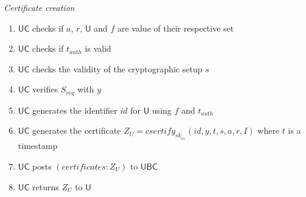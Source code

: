 \documentclass[bibtotoc,halfparskip,oneside]{scrreprt}
\newcommand{\sk}[1]{\mathit{sk}_{#1}\xspace}
\newcommand{\SK}[1]{\sk{_#1}\xspace}
\newcommand{\User}{\ensuremath{\mathsf{U}}\xspace}
\newcommand{\IdentityProvider}{\ensuremath{\mathsf{U}}\xspace}
\newcommand{\UBC}{\ensuremath{\mathsf{UBC}}\xspace}
\newcommand{\UC}{\ensuremath{\mathsf{UC}}\xspace}
\begin{document}
\textit{Certificate creation}
\begin{enumerate}[resume]
	\item \UC checks if $a$, $r$, $\IdentityProvider$ and $\mathit{f}$ are value of their respective set
	\item \UC checks if $t_{auth}$ is valid
	\item \UC checks the validity of the cryptographic setup $s$
	\item \UC verifies $S_{req}$ with $y$
	\item \UC generates the identifier $id$ for $\User$ using $\mathit{f}$ and $t_{auth}$
	\item \UC generates the certificate $Z_{U}=\mathit{csertify}_{\SK{\UC}}(id,y,t, s,a,r,I)$ where $t$ is a timestamp
	\item \UC posts $(\mathit{certificates}: Z_{U})$ to \UBC
	\item \UC returns $Z_{U}$ to $\User$
\end{enumerate} 	
		
	
%
%	
%	
\end{document}
